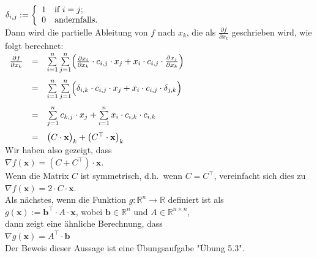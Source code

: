 \documentclass[12pt]{article}
\begin{document}
\\[0.2cm]
\hspace*{1.3cm}
$ \delta_{i,j} := 
\left\{{
\begin{array}[c]{ll}
  1 & \mbox{if $i = j$;} \\
  0 & \mbox{andernfalls.}
\end{array}}
\right. 
$
\\[0.2cm]
%
Dann wird die partielle Ableitung von $f$ nach $x_k$, die als $ \frac{\partial f}{\partial x_k}$ geschrieben wird, wie folgt berechnet:
\\[0.2cm]
\hspace*{1.3cm}
$
\begin{array}[t]{lcl}
 \frac{\partial f}{\partial x_k} & = &
 \sum\limits_{i=1}^n \sum\limits_{j=1}^n \Bigl(
    \frac{\partial x_i}{\partial x_k} \cdot c_{i,j} \cdot x_j + x_i \cdot c_{i,j} \cdot \frac{\partial x_j}{\partial x_k}
    \Bigr) \\[0.5cm]
& = &
 \sum\limits_{i=1}^n \sum\limits_{j=1}^n \Bigl(
    \delta_{i,k} \cdot c_{i,j} \cdot x_j + x_i \cdot c_{i,j} \cdot \delta_{j,k} \Bigr) \\[0.5cm]
& = &
 \sum\limits_{j=1}^n c_{k,j} \cdot x_j + \sum\limits_{i=1}^n x_i \cdot c_{i,k} \cdot c_{i,k} \\[0.5cm]
& = & \bigl(C \cdot \mathbf{x}\bigr)_k + \bigl(C^\top \cdot \mathbf{x}\bigr)_k
\end{array}
$
\\[0.3cm]
Wir haben also gezeigt, dass 
\\[0.3cm]
\hspace*{1.3cm}
$ \nabla f(\mathbf{x}) = (C + C^\top) \cdot \mathbf{x}$.
\\[0.2cm]
Wenn die Matrix $C$ ist {
{\color{blue}}{symmetrisch}}, d.h.~wenn $C = C^\top$, vereinfacht sich dies zu
\\[0.2cm]
\hspace*{1.3cm}
$ \nabla f(\mathbf{x}) = 2 \cdot C \cdot \mathbf{x}$.
\\[0.2cm]
Als nächstes, wenn die Funktion $g: \mathbb{R}^n \rightarrow \mathbb{R}$ definiert ist als 
\\[0.2cm]
\hspace*{1.3cm}
$g(\mathbf{x}) := \mathbf{b}^\top \cdot A \cdot \mathbf{x}$, \quad wobei $\mathbf{b} \in \mathbb{R}^n$ und $A \in \mathbb{R}^{n \times n}$,
\\[0.2cm]
dann zeigt eine ähnliche Berechnung, dass
\\[0.2cm]
\hspace*{1.3cm}
$ \nabla g(\mathbf{x}) = A^\top \cdot \mathbf{b}$ \\[0.2cm]
Der Beweis dieser Aussage ist eine Übungsaufgabe "Übung 5.3".\\[0.2cm]
\end{document}
